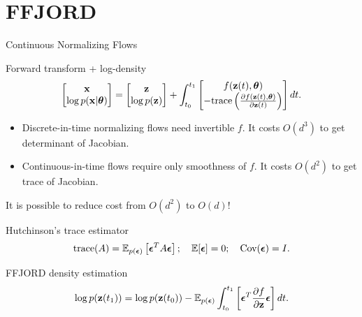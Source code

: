 \section{FFJORD}
\begin{frame}{Continuous Normalizing Flows}
	\begin{block}{Forward transform + log-density}
		\vspace{-0.8cm}
		\[
			\begin{bmatrix}
				\mathbf{x} \\
				\log p(\mathbf{x} | \boldsymbol{\theta})
			\end{bmatrix}
			= 
			\begin{bmatrix}
				\mathbf{z} \\
				\log p(\mathbf{z})
			\end{bmatrix} + 
			\int_{t_0}^{t_1} 
			\begin{bmatrix}
				f(\mathbf{z}(t), \boldsymbol{\theta}) \\
				- \text{trace} \left( \frac{\partial f(\mathbf{z}(t), \boldsymbol{\theta})}{\partial \mathbf{z}(t)} \right) 
			\end{bmatrix} dt.
		\]
		\vspace{-0.4cm}
	\end{block}
	\begin{itemize}
		\item Discrete-in-time normalizing flows need invertible $f$. It costs $O(d^3)$ to get determinant of Jacobian.
		\item Continuous-in-time flows require only smoothness of $f$. It costs $O(d^2)$ to get trace of Jacobian.
	\end{itemize}
	It is possible to reduce cost from $O(d^2)$ to $O(d)$!
	\begin{block}{Hutchinson's trace estimator}
		\vspace{-0.3cm}
		\[
		    \text{trace}(A) = \mathbb{E}_{p(\boldsymbol{\epsilon})} \left[ \boldsymbol{\epsilon}^T A \boldsymbol{\epsilon} \right]; \quad \mathbb{E} [\boldsymbol{\epsilon}] = 0; \quad \text{Cov} (\boldsymbol{\epsilon}) = I.
		\]
		\vspace{-0.5cm}
	\end{block}
	\begin{block}{FFJORD density estimation}
		\vspace{-0.4cm}
		\[
		    \log p(\mathbf{z}(t_1)) = \log p(\mathbf{z}(t_0)) - \mathbb{E}_{p(\boldsymbol{\epsilon})} \int_{t_0}^{t_1} \left[ \boldsymbol{\epsilon}^T \frac{\partial f}{\partial \mathbf{z}} \boldsymbol{\epsilon} \right] dt.
		\]
	\end{block}
\end{frame}
